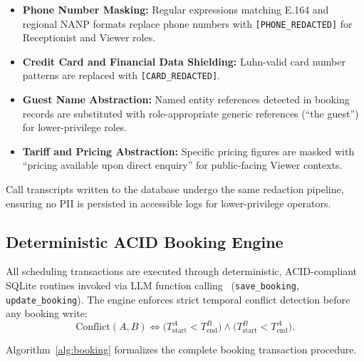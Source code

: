 \documentclass[11pt,a4paper]{article}
\begin{document}
\begin{itemize}[leftmargin=*]
    \item \textbf{Phone Number Masking:} Regular expressions matching E.164 and regional NANP formats replace phone numbers with \texttt{[PHONE\_REDACTED]} for Receptionist and Viewer roles.
    \item \textbf{Credit Card and Financial Data Shielding:} Luhn-valid card number patterns are replaced with \texttt{[CARD\_REDACTED]}.
    \item \textbf{Guest Name Abstraction:} Named entity references detected in booking records are substituted with role-appropriate generic references (``the guest'') for lower-privilege roles.
    \item \textbf{Tariff and Pricing Abstraction:} Specific pricing figures are masked with ``pricing available upon direct enquiry'' for public-facing Viewer contexts.
\end{itemize}

Call transcripts written to the database undergo the same redaction pipeline, ensuring no PII is persisted in accessible logs for lower-privilege operators.

\subsection{Deterministic ACID Booking Engine}
\label{subsec:acid}

All scheduling transactions are executed through deterministic, ACID-compliant SQLite routines invoked via LLM function calling~\cite{schick2023toolformer,yao2023react} (\texttt{save\_booking}, \texttt{update\_booking}). The engine enforces strict temporal conflict detection before any booking write:
\begin{equation}
\text{Conflict}(A, B) \iff \bigl(T_{\text{start}}^A < T_{\text{end}}^B\bigr) \land \bigl(T_{\text{start}}^B < T_{\text{end}}^A\bigr).
\label{eq:conflict}
\end{equation}

Algorithm~\ref{alg:booking} formalizes the complete booking transaction procedure.
\end{document}
